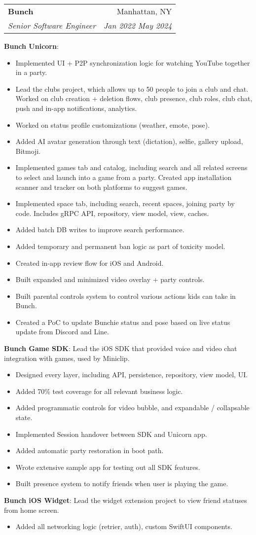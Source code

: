 \documentclass{article}
\makeatletter
\newcommand{\resumeProject}[1]{\small{\textbf{#1}{:}}}
\newcommand{\resumeProjectWithDescription}[2]{\small{\textbf{#1}{: #2\vspace{-2pt}}}}
\newcommand{\resumeProjectItem}[1]{\item\small{{#1}}}
\newcommand{\resumeSubheading}[4]{
  \vspace{-1pt}\item
    \begin{tabular*}{0.97\textwidth}[t]{l@{\extracolsep{\fill}}r}
      \textbf{#1}&#2 \\
      \textit{\small#3}&\textit{\small#4} \\
    \end{tabular*}
}
\newcommand{\resumeItemListStart}{\vspace{-4pt}\begin{itemize}}
\newcommand{\resumeItemListEnd}{\end{itemize}\vspace{-4pt}}
\makeatother
\begin{document}
    \resumeSubheading{Bunch}{Manhattan, NY}{Senior Software Engineer}{Jan 2022 \textendash{} May 2024}
      \resumeProject{Bunch Unicorn}
      \resumeItemListStart{}
        \resumeProjectItem{Implemented UI + P2P synchronization logic for watching YouTube together in a party.}
        \resumeProjectItem{Lead the clubs project, which allows up to 50 people to join a club and chat. Worked on club creation + deletion flows, club presence, club roles, club chat, push and in-app notifications, analytics.}
        \resumeProjectItem{Worked on status profile customizations (weather, emote, pose).}
        \resumeProjectItem{Added AI avatar generation through text (dictation), selfie, gallery upload, Bitmoji.}
        \resumeProjectItem{Implemented games tab and catalog, including search and all related screens to select and launch into a game from a party. Created app installation scanner and tracker on both platforms to suggest games.}
        \resumeProjectItem{Implemented space tab, including search, recent spaces, joining party by code. Includes gRPC API, repository, view model, view, caches.}
        \resumeProjectItem{Added batch DB writes to improve search performance.}
        \resumeProjectItem{Added temporary and permanent ban logic as part of toxicity model.}
        \resumeProjectItem{Created in-app review flow for iOS and Android.}
        \resumeProjectItem{Built expanded and minimized video overlay + party controls.}
        \resumeProjectItem{Built parental controls system to control various actions kids can take in Bunch.}
        \resumeProjectItem{Created a PoC to update Bunchie status and pose based on live status update from Discord and Line.}
      \resumeItemListEnd{}
      \resumeProjectWithDescription{Bunch Game SDK}{Lead the iOS SDK that provided voice and video chat integration with games, used by Miniclip.}
      \resumeItemListStart{}
        \resumeProjectItem{Designed every layer, including API, persistence, repository, view model, UI.}
        \resumeProjectItem{Added 70\% test coverage for all relevant business logic.}
        \resumeProjectItem{Added programmatic controls for video bubble, and expandable / collapsable state.}
        \resumeProjectItem{Implemented Session handover between SDK and Unicorn app.}
        \resumeProjectItem{Added automatic party restoration in boot path.}
        \resumeProjectItem{Wrote extensive sample app for testing out all SDK features.}
        \resumeProjectItem{Built presence system to notify friends when user is playing the game.}
      \resumeItemListEnd{}
      \resumeProjectWithDescription{Bunch iOS Widget}{Lead the widget extension project to view friend statuses from home screen.}
      \resumeItemListStart{}
        \resumeProjectItem{Added all networking logic (retrier, auth), custom SwiftUI components.}
      \resumeItemListEnd{}
\end{document}
